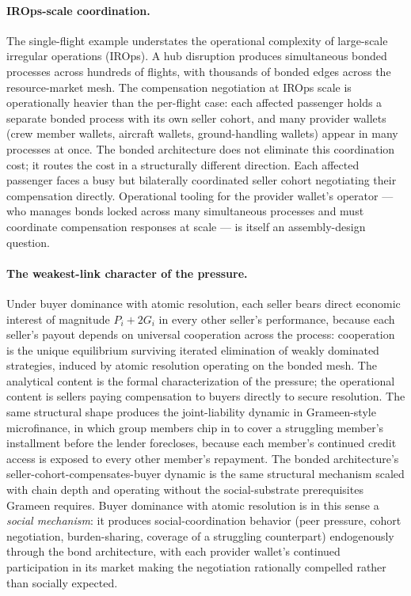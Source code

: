 \documentclass[11pt,a4paper]{article}
\theoremstyle{definition}
\theoremstyle{remark}
\begin{document}
\paragraph{IROps-scale coordination.}
The single-flight example understates the operational complexity
of large-scale irregular operations (IROps). A hub disruption
produces simultaneous bonded processes across hundreds of
flights, with thousands of bonded edges across the resource-market
mesh. The compensation negotiation at IROps scale is operationally
heavier than the per-flight case: each affected passenger holds a
separate bonded process with its own seller cohort, and many
provider wallets (crew member wallets, aircraft wallets,
ground-handling wallets) appear in many processes at once. The
bonded architecture does not eliminate this coordination cost;
it routes the cost in a structurally different direction. Each
affected passenger faces a busy but bilaterally coordinated
seller cohort negotiating their compensation directly.
Operational tooling for the provider wallet's operator --- who
manages bonds locked across many simultaneous processes and must
coordinate compensation responses at scale --- is itself an
assembly-design question.

\paragraph{The weakest-link character of the pressure.}
Under buyer dominance with atomic resolution, each seller bears
direct economic interest of magnitude $P_i + 2G_i$ in every
other seller's performance, because each seller's payout depends
on universal cooperation across the process: cooperation is the
unique equilibrium surviving iterated elimination of weakly
dominated strategies, induced by atomic resolution operating on
the bonded mesh. The analytical content is the formal
characterization of the pressure; the operational content is
sellers paying compensation to buyers directly to secure
resolution. The same structural shape produces the joint-liability
dynamic in Grameen-style microfinance, in which group members
chip in to cover a struggling member's installment before the
lender forecloses, because each member's continued credit access
is exposed to every other member's repayment. The bonded
architecture's seller-cohort-compensates-buyer dynamic is the
same structural mechanism scaled with chain depth and operating
without the social-substrate prerequisites Grameen requires.
Buyer dominance with atomic resolution is in this sense a
\emph{social mechanism}: it produces social-coordination behavior
(peer pressure, cohort negotiation, burden-sharing, coverage of a
struggling counterpart) endogenously through the bond architecture,
with each provider wallet's continued participation in its market
making the negotiation rationally compelled rather than socially
expected.
\end{document}

